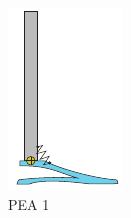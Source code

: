 \begin{figure}[ht!]
\label{fig:compliance_parallel}
\centering
  \begin{subfigure}{.19\textwidth}
    \centering
    \includegraphics[width=\linewidth]{figures/illustration_parallel_prismatic.pdf}
    \caption{PEA 1}
    \label{fig:parallel1}
  \end{subfigure}
  \begin{subfigure}{.19\textwidth}
    \centering

\end{subfigure}
\end{figure}
